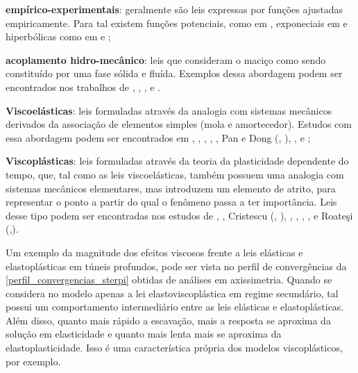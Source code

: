 \begin{alineas}
	
	\item \textbf{empírico-experimentais}: geralmente são leis expressas por funções ajustadas empiricamente. Para tal existem funções potenciais, como em , exponeciais em  e hiperbólicas como em  e ;
	
	\item \textbf{acoplamento hidro-mecânico}: leis que consideram o maciço como sendo constituído por uma fase sólida e fluída. Exemplos dessa abordagem podem ser encontrados nos trabalhos de , , ,  e .
	
	\item \textbf{Viscoelásticas}: leis formuladas através da analogia com sistemas mecânicos derivados da associação de elementos simples (mola e amortecedor). Estudos com essa abordagem podem ser encontrados em , , , , , Pan e Dong (\citeyear{Pan1991a}, \citeyear{Pan1991b}), ,  e ;
	
	\item \textbf{Viscoplásticas}: leis formuladas através da teoria da plasticidade dependente do tempo, que, tal como as leis viscoelásticas, também possuem uma analogia com sistemas mecânicos elementares, mas introduzem um elemento de atrito, para representar o ponto a partir do qual o fenômeno passa a ter importância. Leis desse tipo podem ser encontradas nos estudos de , , Cristescu (\citeyear{Cristescu1985}, \citeyear{Cristescu1988}), , , , ,  e Roate\c{s}i (\citeyear{Roatesi2012},\citeyear{Roatesi2014}).
	
\end{alineas}

Um exemplo da magnitude dos efeitos viscosos frente a leis elásticas e elastoplásticas em túneis profundos, pode ser vista no perfil de convergências da \autoref{perfil_convergencias_sterpi} obtidas de análises em axissimetria. Quando se considera no modelo apenas a lei elastoviscoplástica em regime secundário, tal possui um comportamento intermediário entre as leis elásticas e elastoplásticas. Além disso, quanto mais rápido a escavação, mais a resposta se aproxima da solução em elasticidade e quanto mais lenta mais se aproxima da elastoplasticidade. Isso é uma característica própria dos modelos viscoplásticos, por exemplo.

